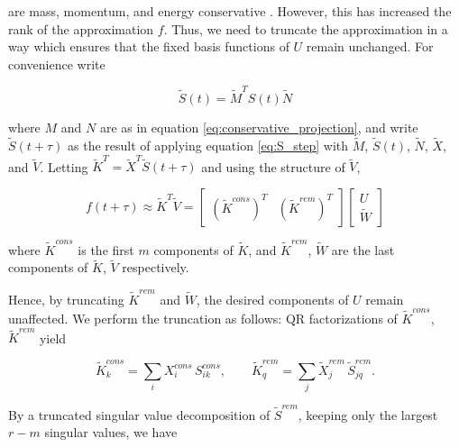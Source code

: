 are mass, momentum, and energy conservative \cite{robustlowrank}. However, this has 
increased the rank of the approximation $f$. Thus, we need to truncate the approximation 
in a way which ensures that the fixed basis functions of $U$ remain unchanged. For 
convenience write 

\begin{equation}
    \widetilde{ S } (t) = \widetilde{ M }^T S(t) \widetilde{ N }
\end{equation}

where $M$ and $N$ are as in equation \ref{eq:conservative_projection}, and write 
$\widetilde{ S } (t + \tau)$ as the result of applying equation \ref{eq:S_step} with 
$\widetilde{ M }$, $\widetilde{ S }(t)$, $\widetilde{ N }$, $\widetilde{ X }$, and $\widetilde{ V }$. 
Letting 
$\widetilde{ K }^T = \widetilde{ X }^T \widetilde{ S } (t + \tau)$ and using the structure of 
$\widetilde{ V }$, 

\begin{equation}\label{eq:K_L_step}
    f (t + \tau) \approx \widetilde{ K }^T \widetilde{ V }
    = \begin{bmatrix}
        (\widetilde{ K }^{cons})^T & (\widetilde{ K }^{rem})^T
    \end{bmatrix}
    \begin{bmatrix}
        U \\ 
        \widetilde{ W }
    \end{bmatrix}
\end{equation}

where $\widetilde{ K }^{cons}$ is the first $m$ components of $\widetilde{ K }$, and 
$\widetilde{ K }^{rem}$, $\widetilde{ W }$ are the last components of 
$\widetilde{ K }$, $\widetilde{ V }$ respectively. 

Hence, by truncating $\widetilde{ K }^{rem}$ and $\widetilde{ W }$, the desired 
components of $U$ remain unaffected. We perform the truncation as follows: QR 
factorizations of $\widetilde{ K }^{cons}$, $\widetilde{ K }^{rem}$ yield 

\begin{equation}
    \widetilde{ K }^{cons}_k = \sum_i X^{cons}_i\, S^{cons}_{ i k} , \quad\quad
    \widetilde{ K }^{rem}_q = \sum_j \widetilde{ X }^{rem}_j\, \widetilde{ S }^{rem}_{j q} . 
\end{equation}

By a truncated singular value decomposition of $\widetilde{ S }^{rem}$, keeping only the 
largest $r - m$ singular values, we have 

